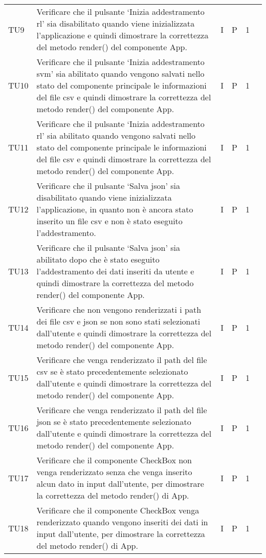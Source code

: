 \begin{longtable} {
		>{}p{12mm}
		>{}p{79.5mm}
		>{}p{9mm}
		>{}p{8mm}
		>{}p{14mm}
		>{}p{0mm}}
	TU9			& Verificare che il pulsante ‘Inizia addestramento rl’ sia disabilitato quando viene inizializzata l’applicazione e quindi dimostrare la correttezza del metodo render() del componente App.& I & P & 1 &\TBstrut \\ [2mm]
	TU10		& Verificare che il pulsante ‘Inizia addestramento svm’ sia abilitato quando vengono salvati nello stato del componente principale le informazioni del file csv e quindi dimostrare la correttezza del metodo render() del componente App.& I & P & 1 &\TBstrut \\ [2mm]
	TU11    	& Verificare che il pulsante ‘Inizia addestramento rl’ sia abilitato quando vengono salvati nello stato del componente principale le informazioni del file csv e quindi dimostrare la correttezza del metodo render() del componente App.& I & P & 1 &\TBstrut \\ [2mm]
	TU12    	& Verificare che il pulsante ‘Salva json’ sia disabilitato quando viene inizializzata l’applicazione, in quanto non è ancora stato inserito un file csv e non è stato eseguito l’addestramento.& I & P & 1 &\TBstrut \\ [2mm]
	TU13     	& Verificare che il pulsante ‘Salva json’ sia abilitato dopo che è stato eseguito l’addestramento dei dati inseriti da utente e quindi dimostrare la correttezza del metodo render() del componente App.& I & P & 1 &\TBstrut \\ [2mm]
	TU14	    & Verificare che non vengono renderizzati i path dei file csv e json se non sono stati selezionati dall’utente e quindi dimostrare la correttezza del metodo render() del componente App.& I & P & 1 &\TBstrut \\ [2mm]
	TU15     	& Verificare che venga renderizzato il path del file csv se è stato precedentemente selezionato dall’utente e quindi dimostrare la correttezza del metodo render() del componente App.& I & P & 1 &\TBstrut \\ [2mm]
	TU16	    & Verificare che venga renderizzato il path del file json se è stato precedentemente selezionato dall’utente e quindi dimostrare la correttezza del metodo render() del componente App.& I & P & 1 &\TBstrut \\ [2mm]
	TU17		& Verificare che il componente CheckBox non venga renderizzato senza che venga inserito alcun dato in input dall'utente, per dimostrare la correttezza del metodo render() di App.& I & P & 1 &\TBstrut \\ [2mm]
	TU18		& Verificare che il componente CheckBox venga renderizzato quando vengono inseriti dei dati in input dall'utente, per dimostrare la correttezza del metodo render() di App.& I & P & 1 &\TBstrut \\ [2mm]

\end{longtable}

